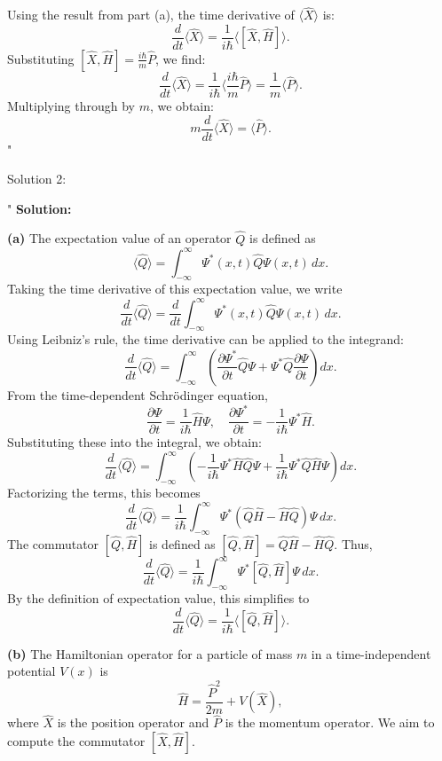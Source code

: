 Using the result from part (a), the time derivative of $\langle \hat{X} \rangle$ is:
\[
\frac{d}{dt} \langle \hat{X} \rangle = \frac{1}{i\hbar} \langle [\hat{X}, \hat{H}] \rangle.
\]
Substituting $[\hat{X}, \hat{H}] = \frac{i\hbar}{m} \hat{P}$, we find:
\[
\frac{d}{dt} \langle \hat{X} \rangle = \frac{1}{i\hbar} \langle \frac{i\hbar}{m} \hat{P} \rangle = \frac{1}{m} \langle \hat{P} \rangle.
\]
Multiplying through by $m$, we obtain:
\[
m \frac{d}{dt} \langle \hat{X} \rangle = \langle \hat{P} \rangle.
\]
"

Solution 2: 

"
\textbf{Solution:}

\textbf{(a)}  
The expectation value of an operator $\hat{Q}$ is defined as  
\[
\langle \hat{Q} \rangle = \int_{-\infty}^\infty \Psi^*(x,t) \hat{Q} \Psi(x,t) \, dx.
\]  
Taking the time derivative of this expectation value, we write  
\[
\frac{d}{dt} \langle \hat{Q} \rangle = \frac{d}{dt} \int_{-\infty}^\infty \Psi^*(x,t) \hat{Q} \Psi(x,t) \, dx.
\]  
Using Leibniz's rule, the time derivative can be applied to the integrand:  
\[
\frac{d}{dt} \langle \hat{Q} \rangle = \int_{-\infty}^\infty \left( \frac{\partial \Psi^*}{\partial t} \hat{Q} \Psi + \Psi^* \hat{Q} \frac{\partial \Psi}{\partial t} \right) dx.
\]  
From the time-dependent Schrödinger equation,  
\[
\frac{\partial \Psi}{\partial t} = \frac{1}{i\hbar} \hat{H} \Psi, \quad \frac{\partial \Psi^*}{\partial t} = -\frac{1}{i\hbar} \Psi^* \hat{H}.
\]  
Substituting these into the integral, we obtain:  
\[
\frac{d}{dt} \langle \hat{Q} \rangle = \int_{-\infty}^\infty \left( -\frac{1}{i\hbar} \Psi^* \hat{H} \hat{Q} \Psi + \frac{1}{i\hbar} \Psi^* \hat{Q} \hat{H} \Psi \right) dx.
\]  
Factorizing the terms, this becomes  
\[
\frac{d}{dt} \langle \hat{Q} \rangle = \frac{1}{i\hbar} \int_{-\infty}^\infty \Psi^* \left( \hat{Q} \hat{H} - \hat{H} \hat{Q} \right) \Psi \, dx.
\]  
The commutator $[\hat{Q}, \hat{H}]$ is defined as $[\hat{Q}, \hat{H}] = \hat{Q}\hat{H} - \hat{H}\hat{Q}$. Thus,  
\[
\frac{d}{dt} \langle \hat{Q} \rangle = \frac{1}{i\hbar} \int_{-\infty}^\infty \Psi^* [\hat{Q}, \hat{H}] \Psi \, dx.
\]  
By the definition of expectation value, this simplifies to  
\[
\frac{d}{dt} \langle \hat{Q} \rangle = \frac{1}{i\hbar} \langle [\hat{Q}, \hat{H}] \rangle.
\]  

\textbf{(b)}  
The Hamiltonian operator for a particle of mass $m$ in a time-independent potential $V(x)$ is  
\[
\hat{H} = \frac{\hat{P}^2}{2m} + V(\hat{X}),
\]  
where $\hat{X}$ is the position operator and $\hat{P}$ is the momentum operator. We aim to compute the commutator $[\hat{X}, \hat{H}]$.


